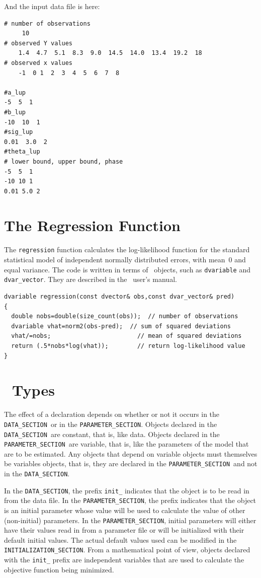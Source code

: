 \documentclass{admbmanual}
\newcommand\DS{\texttt{DATA\_SECTION}}
\newcommand\PS{\texttt{PARAMETER\_SECTION}}
\begin{document}
And the input data file is here:

\begin{lstlisting}
# number of observations
     10
# observed Y values
    1.4  4.7  5.1  8.3  9.0  14.5  14.0  13.4  19.2  18
# observed x values
    -1  0 1  2  3  4  5  6  7  8

#a_lup
-5  5  1
#b_lup
-10  10  1
#sig_lup
0.01  3.0  2
#theta_lup
# lower bound, upper bound, phase
-5  5  1
-10 10 1
0.01 5.0 2
\end{lstlisting}


\appendix

\chapter{The Regression Function}\label{ch:appendix-regression-function}

The \texttt{regression} function calculates the log-likelihood function
for the standard statistical model of independent normally distributed errors,
with mean~0 and equal variance. The code is written in terms of \scAD\ objects,
such as \texttt{dvariable} and \texttt{dvar\_vector}. They are described in the
\scAD\ user's manual.
\begin{lstlisting}
dvariable regression(const dvector& obs,const dvar_vector& pred)
{
  double nobs=double(size_count(obs));  // number of observations
  dvariable vhat=norm2(obs-pred);  // sum of squared deviations
  vhat/=nobs;                        // mean of squared deviations
  return (.5*nobs*log(vhat));        // return log-likelihood value
}
\end{lstlisting}

\chapter{\ADM\ Types}

The effect of a declaration depends on whether or not it occurs in the \DS\ or
in the \PS. Objects declared in the \DS\ are constant, that is, like data.
Objects declared in the \PS\ are variable, that is, like the parameters of the
model that are to be estimated. Any objects that depend on variable objects must
themselves be variables objects, that is, they are declared in the \PS\ and not
in the \DS.

In the \DS, the prefix \texttt{init\_} indicates that the object is to be read
in from the data file. In the \PS, the prefix indicates that the object is an
initial parameter whose value will be used to calculate the value of other
(non-initial) parameters. In the \PS, initial parameters will either have their
values read in from a parameter file or will be initialized with their default
initial values. The actual default values used can be modified in the
\texttt{INITIALIZATION\_SECTION}. From a mathematical point of view, objects
declared with the \texttt{init\_} prefix are independent variables that are used
to calculate the objective function being minimized.
\end{document}
